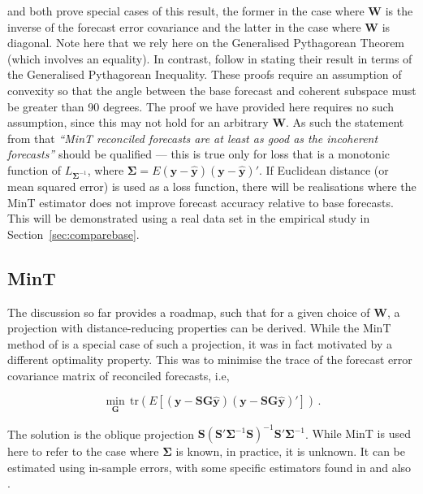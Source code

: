 \documentclass[12pt]{article}
\theoremstyle{definition}
\begin{document}
\citet{WicEtAl2019} and \citet{VanErven2015a} both prove special cases of this result, the former in the case where $\bm{W}$ is the inverse of the forecast error covariance and the latter in the case where $\bm{W}$ is diagonal.  Note here that we rely here on the Generalised Pythagorean Theorem (which involves an equality). In contrast, \citet{WicEtAl2019} follow \citet{VanErven2015a} in stating their result in terms of the Generalised Pythagorean Inequality. These proofs require an assumption of convexity so that the angle between the base forecast and coherent subspace must be greater than 90 degrees. The proof we have provided here requires no such assumption, since this may not hold for an arbitrary $\bm{W}$. As such the statement from \citet{WicEtAl2019} that \emph{``MinT reconciled forecasts are at least as good as the incoherent forecasts''} should be qualified --- this is true only for loss {\color{blue}that is a monotonic function of $L_{\bm{\Sigma}^{-1}}$, where $\bm{\Sigma}=E(\bm{y}-\hat{\bm{y}})(\bm{y}-\hat{\bm{y}})'$}. If Euclidean distance (or mean squared error) is used {\color{blue} as a loss function}, there will be realisations where the MinT estimator does not improve forecast accuracy relative to base forecasts. This will be demonstrated using a real data set in the empirical study in Section~\ref{sec:comparebase}.

\subsection{MinT}

{\color{blue}The discussion so far provides a roadmap, such that for a given choice of $\bm{W}$, a projection with distance-reducing properties can be derived}. While the MinT method of \citet{WicEtAl2019} {\color{blue} is a special case of such a projection, it was in fact motivated by a different optimality property.  This was to minimise the} trace of the forecast error covariance matrix of reconciled forecasts, i.e,
	
{\color{blue}
\begin{equation}
\label{eq:MinTObj}
\underset{\bm{G}}{\min}\,\textrm{tr}(E\left[(\bm{y}-{\bm S}{\bm G}\hat{\bm{y}})(\bm{y}-{\bm S}{\bm G}\hat{\bm{y}})'\right])\,.
\end{equation}
}

The solution is the oblique projection {\color{blue} $\bm{S}\left(\bm{S}'\bm{\Sigma}^{-1}\bm{S}\right)^{-1}\bm{S}'\bm{\Sigma}^{-1}$}. {\color{blue} While MinT is used here to refer to the case where $\bm{\Sigma}$ is known, in practice,} it is unknown.  It can be estimated using in-sample errors, {\color{blue} with some specific estimators found in \cite{WicEtAl2019} and also \cite{NysEtAl2020}.}
\end{document}
